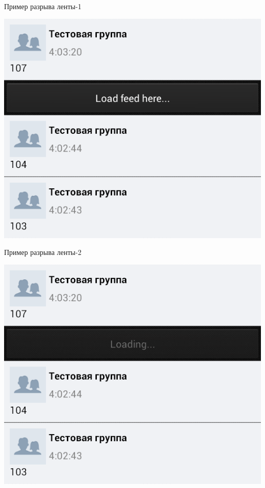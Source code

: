 \documentclass[utf8,xcolor=table]{beamer}
\begin{document}
\begin{frame}[t]{Пример разрыва ленты-1}
	\begin{center}
		\includegraphics[scale=0.5]{a.png}
	\end{center}
\end{frame}
\begin{frame}[t]{Пример разрыва ленты-2}
	\begin{center}
		\includegraphics[scale=0.5]{b.png}
	\end{center}
\end{frame}
\end{document}
